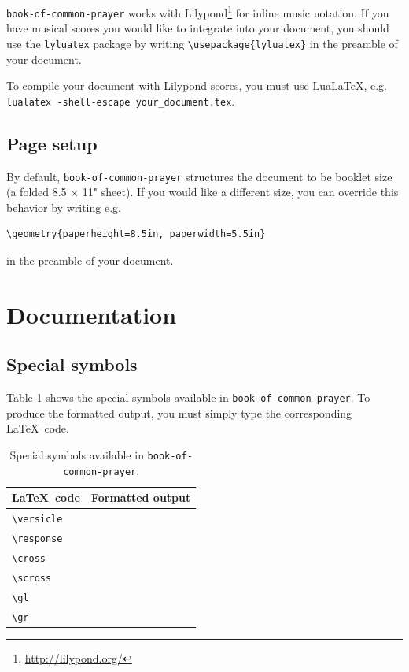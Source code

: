 \documentclass{article}
\begin{document}
\texttt{book-of-common-prayer} works with Lilypond\footnote{\url{http://lilypond.org/}} for inline music notation. If you have musical scores you would like to integrate into your document, you should use the \texttt{lyluatex} package by writing \lstinline|\usepackage{lyluatex}| in the preamble of your document.

To compile your document with Lilypond scores, you must use Lua\LaTeX, e.g. \lstinline{lualatex -shell-escape your_document.tex}.

\subsection{Page setup}

By default, \texttt{book-of-common-prayer} structures the document to be booklet size (a folded 8.5 $\times$ 11" sheet). If you would like a different size, you can override this behavior by writing e.g.

\begin{lstlisting}
\geometry{paperheight=8.5in, paperwidth=5.5in}
\end{lstlisting}

in the preamble of your document.

\section{Documentation}

\subsection{Special symbols}

Table \ref{tab:symbol} shows the special symbols available in \lstinline{book-of-common-prayer}. To produce the formatted output, you must simply type the corresponding \LaTeX\ code.

\begin{table}[h!]
	\centering
	\begin{tabular}{ll}
	\toprule
	\LaTeX\ code & Formatted output \\
	\midrule
	\lstinline|\versicle| & \versicle \\
	\lstinline|\response| & \response \\
	\lstinline|\cross| & \cross \\
	\lstinline|\scross| & \sabon{\scross} \\
	\lstinline|\gl| & \gl \\
	\lstinline|\gr| & \gr \\
	\bottomrule
	\end{tabular}
	\caption{Special symbols available in \lstinline{book-of-common-prayer}.}
	\label{tab:symbol}
\end{table}
\end{document}

